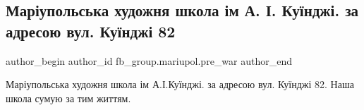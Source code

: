  
 
 
 
 

\subsection{Маріупольська художня школа ім А. І. Куїнджі. за адресою вул. Куїнджі 82}
\label{sec:31_01_2023.fb.fb_group.mariupol.pre_war.3.mar_upolska_khudozhn}

\ifcmt
 author_begin
   author_id fb_group.mariupol.pre_war
 author_end
\fi

Маріупольська художня школа ім А.І.Куїнджі. за адресою вул. Куїнджі 82. Наша школа сумую за тим життям.

